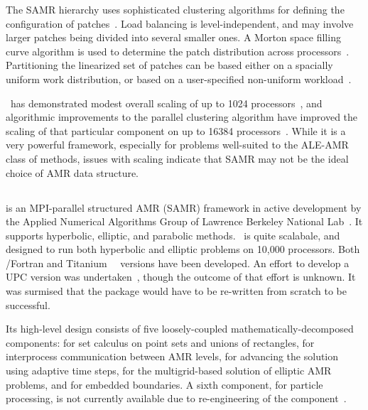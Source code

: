 \documentclass[10pt,twocolumn]{article}
\begin{document}
The SAMR hierarchy uses sophisticated clustering algorithms for
defining the configuration of patches~\cite{GuWi06}.  Load balancing
is level-independent, and may involve larger patches being divided
into several smaller ones.  A Morton space filling curve algorithm is
used to determine the patch distribution across
processors~\cite{WiHo01}.  Partitioning the linearized set of patches
can be based either on a spacially uniform work distribution, or based
on a user-specified non-uniform workload~\cite{wwwsamraicode}.

\samrai\ has demonstrated modest overall scaling of up to 1024
processors~\cite{WiHy03}, and algorithmic improvements to the parallel
clustering algorithm have improved the scaling of that particular
component on up to 16384 processors~\cite{GuWi06}.  While it is a very
powerful framework, especially for problems well-suited to the ALE-AMR
class of methods, issues with scaling indicate that SAMR may not be the
ideal choice of AMR data structure.

\subsection{\chombo} \label{ss:chombo}

\chombo is an MPI-parallel structured AMR (SAMR) framework in active
development by the Applied Numerical Algorithms Group of Lawrence
Berkeley National Lab~\nocite{CoGr09}.  It supports hyperbolic,
elliptic, and parabolic methods.  \chombo\ is quite scalabale, and
designed to run both hyperbolic and elliptic problems on 10,000
processors.  Both \cpp/Fortran and
Titanium~\cite{wwwtitanium}~\cite{YeSe98} versions have been
developed.  An effort to develop a UPC version was
undertaken~\cite{We04}, though the outcome of that effort is unknown.
It was surmised that the package would have to be re-written from
scratch to be successful.

Its high-level design consists of five loosely-coupled
mathematically-decomposed components:  for set calculus
on point sets and unions of rectangles,  for
interprocess communication between AMR levels, 
for advancing the solution using adaptive time steps,
 for the multigrid-based solution of elliptic AMR
problems, and  for embedded boundaries.  A sixth
component,  for particle processing, is not
currently available due to re-engineering of the
component~\cite{wwwchombo}.
\end{document}
